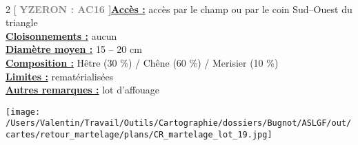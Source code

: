 \documentclass[a4paper,openany]{book}\usepackage[]{graphicx}\usepackage[]{color}
\begin{document}
\\\begin{multicols}{2}
[
\textbf{\textcolor{gray}{
\large YZERON : AC16
}}
]\noindent\textbf{\underline{Accès :}} accès par le champ ou par le coin Sud--Ouest du triangle\vspace{0.1cm} \\\noindent\textbf{\underline{Cloisonnements :}} aucun\vspace{0.1cm} \\\noindent\textbf{\underline{Diamètre moyen :}} 15 -- 20 cm\vspace{0.1cm} \\\noindent\textbf{\underline{Composition :}} Hêtre (30 \%) / Chêne (60 \%) / Merisier (10 \%)\vspace{0.1cm} \\\noindent\textbf{\underline{Limites :}} rematérialisées\vspace{0.1cm} \\\noindent\textbf{\underline{Autres remarques :}} lot d'affouage\vspace{0.1cm} \\\end{multicols}\begin{center}
\texttt{[image: /Users/Valentin/Travail/Outils/Cartographie/dossiers/Bugnot/ASLGF/out/cartes/retour\_martelage/plans/CR\_martelage\_lot\_19.jpg]}
\end{center}\newpage\noindent
\end{document}

